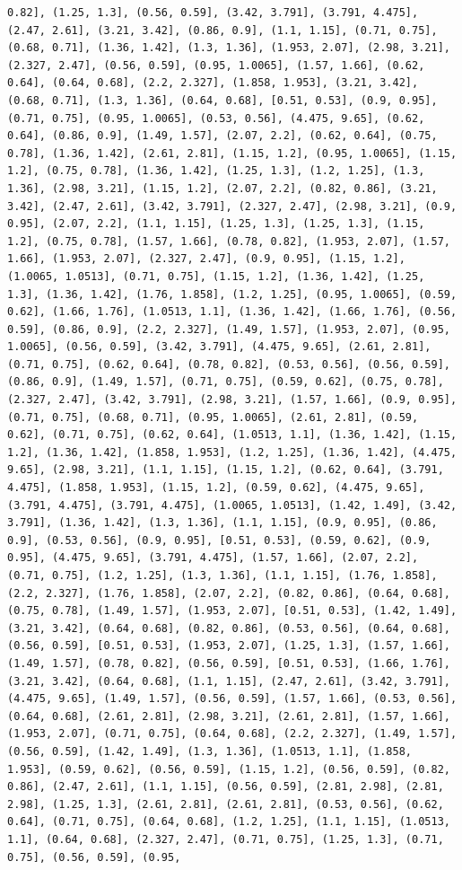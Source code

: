 \documentclass[12pt,fleqn]{article}\usepackage{../common}
\begin{document}
\begin{verbatim}
0.82], (1.25, 1.3], (0.56, 0.59], (3.42, 3.791], (3.791, 4.475], (2.47, 2.61], (3.21, 3.42], (0.86, 0.9], (1.1, 1.15], (0.71, 0.75], (0.68, 0.71], (1.36, 1.42], (1.3, 1.36], (1.953, 2.07], (2.98, 3.21], (2.327, 2.47], (0.56, 0.59], (0.95, 1.0065], (1.57, 1.66], (0.62, 0.64], (0.64, 0.68], (2.2, 2.327], (1.858, 1.953], (3.21, 3.42], (0.68, 0.71], (1.3, 1.36], (0.64, 0.68], [0.51, 0.53], (0.9, 0.95], (0.71, 0.75], (0.95, 1.0065], (0.53, 0.56], (4.475, 9.65], (0.62, 0.64], (0.86, 0.9], (1.49, 1.57], (2.07, 2.2], (0.62, 0.64], (0.75, 0.78], (1.36, 1.42], (2.61, 2.81], (1.15, 1.2], (0.95, 1.0065], (1.15, 1.2], (0.75, 0.78], (1.36, 1.42], (1.25, 1.3], (1.2, 1.25], (1.3, 1.36], (2.98, 3.21], (1.15, 1.2], (2.07, 2.2], (0.82, 0.86], (3.21, 3.42], (2.47, 2.61], (3.42, 3.791], (2.327, 2.47], (2.98, 3.21], (0.9, 0.95], (2.07, 2.2], (1.1, 1.15], (1.25, 1.3], (1.25, 1.3], (1.15, 1.2], (0.75, 0.78], (1.57, 1.66], (0.78, 0.82], (1.953, 2.07], (1.57, 1.66], (1.953, 2.07], (2.327, 2.47], (0.9, 0.95], (1.15, 1.2], (1.0065, 1.0513], (0.71, 0.75], (1.15, 1.2], (1.36, 1.42], (1.25, 1.3], (1.36, 1.42], (1.76, 1.858], (1.2, 1.25], (0.95, 1.0065], (0.59, 0.62], (1.66, 1.76], (1.0513, 1.1], (1.36, 1.42], (1.66, 1.76], (0.56, 0.59], (0.86, 0.9], (2.2, 2.327], (1.49, 1.57], (1.953, 2.07], (0.95, 1.0065], (0.56, 0.59], (3.42, 3.791], (4.475, 9.65], (2.61, 2.81], (0.71, 0.75], (0.62, 0.64], (0.78, 0.82], (0.53, 0.56], (0.56, 0.59], (0.86, 0.9], (1.49, 1.57], (0.71, 0.75], (0.59, 0.62], (0.75, 0.78], (2.327, 2.47], (3.42, 3.791], (2.98, 3.21], (1.57, 1.66], (0.9, 0.95], (0.71, 0.75], (0.68, 0.71], (0.95, 1.0065], (2.61, 2.81], (0.59, 0.62], (0.71, 0.75], (0.62, 0.64], (1.0513, 1.1], (1.36, 1.42], (1.15, 1.2], (1.36, 1.42], (1.858, 1.953], (1.2, 1.25], (1.36, 1.42], (4.475, 9.65], (2.98, 3.21], (1.1, 1.15], (1.15, 1.2], (0.62, 0.64], (3.791, 4.475], (1.858, 1.953], (1.15, 1.2], (0.59, 0.62], (4.475, 9.65], (3.791, 4.475], (3.791, 4.475], (1.0065, 1.0513], (1.42, 1.49], (3.42, 3.791], (1.36, 1.42], (1.3, 1.36], (1.1, 1.15], (0.9, 0.95], (0.86, 0.9], (0.53, 0.56], (0.9, 0.95], [0.51, 0.53], (0.59, 0.62], (0.9, 0.95], (4.475, 9.65], (3.791, 4.475], (1.57, 1.66], (2.07, 2.2], (0.71, 0.75], (1.2, 1.25], (1.3, 1.36], (1.1, 1.15], (1.76, 1.858], (2.2, 2.327], (1.76, 1.858], (2.07, 2.2], (0.82, 0.86], (0.64, 0.68], (0.75, 0.78], (1.49, 1.57], (1.953, 2.07], [0.51, 0.53], (1.42, 1.49], (3.21, 3.42], (0.64, 0.68], (0.82, 0.86], (0.53, 0.56], (0.64, 0.68], (0.56, 0.59], [0.51, 0.53], (1.953, 2.07], (1.25, 1.3], (1.57, 1.66], (1.49, 1.57], (0.78, 0.82], (0.56, 0.59], [0.51, 0.53], (1.66, 1.76], (3.21, 3.42], (0.64, 0.68], (1.1, 1.15], (2.47, 2.61], (3.42, 3.791], (4.475, 9.65], (1.49, 1.57], (0.56, 0.59], (1.57, 1.66], (0.53, 0.56], (0.64, 0.68], (2.61, 2.81], (2.98, 3.21], (2.61, 2.81], (1.57, 1.66], (1.953, 2.07], (0.71, 0.75], (0.64, 0.68], (2.2, 2.327], (1.49, 1.57], (0.56, 0.59], (1.42, 1.49], (1.3, 1.36], (1.0513, 1.1], (1.858, 1.953], (0.59, 0.62], (0.56, 0.59], (1.15, 1.2], (0.56, 0.59], (0.82, 0.86], (2.47, 2.61], (1.1, 1.15], (0.56, 0.59], (2.81, 2.98], (2.81, 2.98], (1.25, 1.3], (2.61, 2.81], (2.61, 2.81], (0.53, 0.56], (0.62, 0.64], (0.71, 0.75], (0.64, 0.68], (1.2, 1.25], (1.1, 1.15], (1.0513, 1.1], (0.64, 0.68], (2.327, 2.47], (0.71, 0.75], (1.25, 1.3], (0.71, 0.75], (0.56, 0.59], (0.95, 
\end{verbatim}
\end{document}
